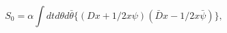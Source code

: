 \begin{equation}\label{S0N2}
 S_0=\alpha\int dtd\theta d\bar{\theta}\{ (Dx+1/2x\psi) (\bar D x-1/2x\bar\psi)\},
\end{equation}

